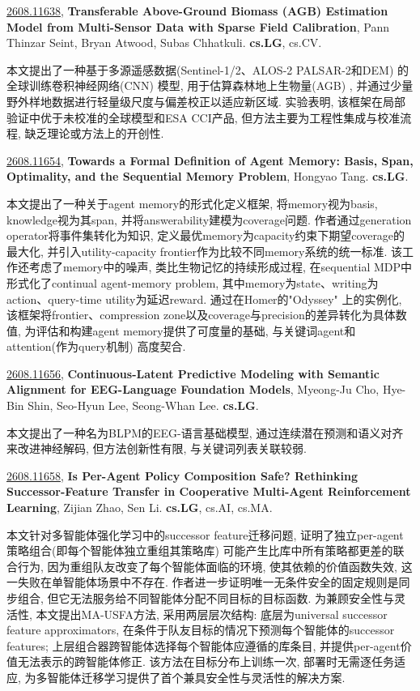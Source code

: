 \documentclass[9pt, a4paper]{article}
\theoremstyle{plain}
\theoremstyle{definition}
\theoremstyle{remark}
\newcommand{\arxivwithtarget}[3]{\hypertarget{#1}{}\href{https://arxiv.org/abs/#1}{#1}, \textbf{\textcolor{arxivblue}{#2}}, #3. }
\begin{document}
\arxivwithtarget{2608.11638}{Transferable Above-Ground Biomass (AGB) Estimation Model from Multi-Sensor Data with Sparse Field Calibration}{Pann Thinzar Seint, Bryan Atwood, Subas Chhatkuli}\textbf{cs.LG}, cs.CV.

本文提出了一种基于多源遥感数据(Sentinel-1/2、ALOS-2 PALSAR-2和DEM) 的全球训练卷积神经网络(CNN) 模型, 用于估算森林地上生物量(AGB) , 并通过少量野外样地数据进行轻量级尺度与偏差校正以适应新区域. 实验表明, 该框架在局部验证中优于未校准的全球模型和ESA CCI产品, 但方法主要为工程性集成与校准流程, 缺乏理论或方法上的开创性.


\arxivwithtarget{2608.11654}{Towards a Formal Definition of Agent Memory: Basis, Span, Optimality, and the Sequential Memory Problem}{Hongyao Tang}\textbf{cs.LG}.

本文提出了一种关于agent memory的形式化定义框架, 将memory视为basis, knowledge视为其span, 并将answerability建模为coverage问题. 作者通过generation operator将事件集转化为知识, 定义最优memory为capacity约束下期望coverage的最大化, 并引入utility-capacity frontier作为比较不同memory系统的统一标准. 该工作还考虑了memory中的噪声, 类比生物记忆的持续形成过程, 在sequential MDP中形式化了continual agent-memory problem, 其中memory为state、writing为action、query-time utility为延迟reward. 通过在Homer的"Odyssey" 上的实例化, 该框架将frontier、compression zone以及coverage与precision的差异转化为具体数值, 为评估和构建agent memory提供了可度量的基础, 与关键词agent和attention(作为query机制) 高度契合.


\arxivwithtarget{2608.11656}{Continuous-Latent Predictive Modeling with Semantic Alignment for EEG-Language Foundation Models}{Myeong-Ju Cho, Hye-Bin Shin, Seo-Hyun Lee, Seong-Whan Lee}\textbf{cs.LG}.

本文提出了一种名为BLPM的EEG-语言基础模型, 通过连续潜在预测和语义对齐来改进神经解码, 但方法创新性有限, 与关键词列表关联较弱.


\arxivwithtarget{2608.11658}{Is Per-Agent Policy Composition Safe? Rethinking Successor-Feature Transfer in Cooperative Multi-Agent Reinforcement Learning}{Zijian Zhao, Sen Li}\textbf{cs.LG}, cs.AI, cs.MA.

本文针对多智能体强化学习中的successor feature迁移问题, 证明了独立per-agent策略组合(即每个智能体独立重组其策略库) 可能产生比库中所有策略都更差的联合行为, 因为重组队友改变了每个智能体面临的环境, 使其依赖的价值函数失效, 这一失败在单智能体场景中不存在. 作者进一步证明唯一无条件安全的固定规则是同步组合, 但它无法服务给不同智能体分配不同目标的目标函数. 为兼顾安全性与灵活性, 本文提出MA-USFA方法, 采用两层层次结构: 底层为universal successor feature approximators, 在条件于队友目标的情况下预测每个智能体的successor features; 上层组合器跨智能体选择每个智能体应遵循的库条目, 并提供per-agent价值无法表示的跨智能体修正. 该方法在目标分布上训练一次, 部署时无需逐任务适应, 为多智能体迁移学习提供了首个兼具安全性与灵活性的解决方案.
\end{document}
